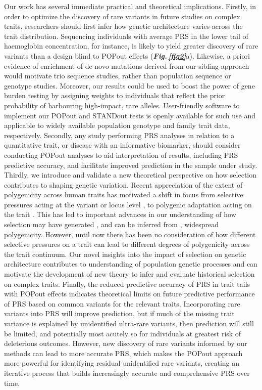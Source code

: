 \documentclass[12pt]{zHenriquesLab-StyleBioRxiv}
\newcommand\fref[1]{\normalsize{\textbf{\textit{Fig.\,\ref{#1}}}}\normalsize{}}
\begin{document}
Our work has several immediate practical and theoretical implications. 
Firstly, in order to optimize the discovery of rare variants in future 
studies on complex traits, researchers should first infer how genetic 
architecture varies across the trait distribution. 
Sequencing individuals with average PRS in the lower tail of 
haemoglobin concentration, for instance, is likely to yield greater 
discovery of rare variants than a design blind to POPout 
effects (\fref{fig2}{a}). Likewise, a priori evidence of enrichment of de 
novo mutations derived from our sibling approach \cite{Souaiaia2024} 
would motivate trio sequence studies, rather than population 
sequence or genotype studies. Moreover, our results could be 
used to boost the power of gene burden testing \cite{Lee2012}
by assigning weights to individuals that reflect the prior probability 
of harbouring high-impact, rare alleles. User-friendly software 
to implement our POPout and STANDout tests is openly available 
for such use and applicable to widely available population 
genotype and family trait data, respectively. Secondly, 
any study performing PRS analyses in relation to a quantitative trait, 
or disease with an informative biomarker, should consider 
conducting POPout analyses to aid interpretation of results, 
including PRS predictive accuracy, and facilitate improved prediction 
in the sample under study. Thirdly, we introduce and validate a new 
theoretical perspective on how selection contributes 
to shaping genetic variation. Recent appreciation of the extent 
of polygenicity across human traits has motivated a shift 
in focus from selective pressures acting at the 
variant or locus level \cite{Sabeti2002,Paul2008}, 
to polygenic adaptation acting on the trait \cite{Pritchard2010, Hollinger2019}. 
This has led to important advances in our understanding 
of how selection may have generated \cite{Oconnor2019}, 
and can be inferred from \cite{Barghi2020}, 
widespread polygenicity. However, until now there has been 
no consideration of how different selective pressures on a trait 
can lead to different degrees of polygenicity across the trait continuum. 
Our novel insights into the impact of selection on genetic architecture 
contributes to understanding of population genetic processes and can motivate 
the development of new theory to infer and evaluate historical selection on complex traits. 
Finally, the reduced predictive accuracy of PRS in trait tails 
with POPout effects indicates theoretical limits on future predictive 
performance of PRS based on common variants for the relevant traits. 
Incorporating rare variants into PRS will improve prediction, but if much of 
the missing trait variance is explained by unidentified ultra-rare variants, 
then prediction will still be limited, and potentially most acutely 
so for individuals at greatest risk of deleterious outcomes. 
However, new discovery of rare variants informed by our methods can lead 
to more accurate PRS, which makes the POPout approach more powerful for 
identifying residual unidentified rare variants, creating an iterative 
process that builds increasingly accurate and comprehensive PRS over time.
\end{document}
